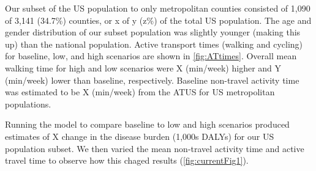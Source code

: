 Our subset of the US population to only metropolitan counties consisted of 1,090 of 3,141 (34.7\%) counties, or x of y (z\%) of the total US population. The age and gender distribution of our subset population was slightly younger (making this up) than the national population. Active transport times (walking and cycling) for baseline, low, and high scenarios are shown in \ref{fig:ATtimes}. Overall mean walking time for high and low scenarios were X (min/week) higher and Y (min/week) lower than baseline, respectively. Baseline non-travel activity time was estimated to be X (min/week) from the ATUS for US metropolitan populations.  

Running the model to compare baseline to low and high scenarios produced estimates of X change in the disease burden (1,000s DALYs) for our US population subset. We then varied the mean non-travel activity time and active travel time to observe how this chaged results (\ref{fig:currentFig1}).



